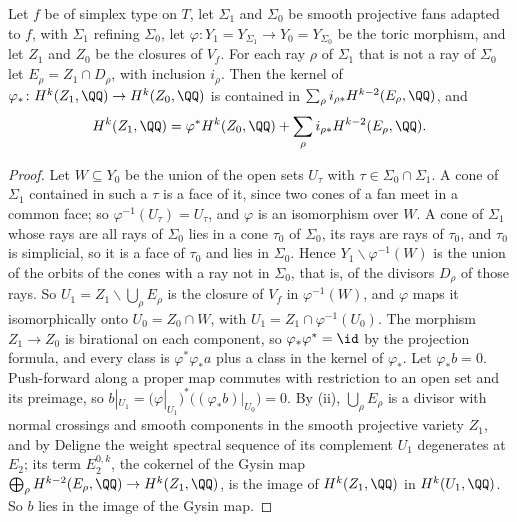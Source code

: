 \begin{lemma}\label{lem:toricmod}
Let $f$ be of simplex type on $T$, let $\Sigma_{1}$ and $\Sigma_{0}$ be
smooth projective fans adapted to $f$, with $\Sigma_{1}$ refining
$\Sigma_{0}$, let $\varphi\colon Y_{1}=Y_{\Sigma_{1}}\to Y_{0}=Y_{\Sigma_{0}}$
be the toric morphism, and let $Z_{1}$ and $Z_{0}$ be the closures of
$V_{f}$. For each ray $\rho$ of $\Sigma_{1}$ that is not a ray of
$\Sigma_{0}$ let $E_{\rho}=Z_{1}\cap D_{\rho}$, with inclusion $i_{\rho}$.
Then the kernel of $\varphi_{*}\colon H^{k}(Z_{1},\QQ)\to H^{k}(Z_{0},\QQ)$ is
contained in $\sum_{\rho}i_{\rho*}H^{k-2}(E_{\rho},\QQ)$, and
\[
  H^{k}(Z_{1},\QQ)=\varphi^{*}H^{k}(Z_{0},\QQ)
  +\sum_{\rho}i_{\rho*}H^{k-2}(E_{\rho},\QQ).
\]
\end{lemma}

\begin{proof}
Let $W\subseteq Y_{0}$ be the union of the open sets $U_{\tau}$ with
$\tau\in\Sigma_{0}\cap\Sigma_{1}$. A cone of $\Sigma_{1}$ contained in such a
$\tau$ is a face of it, since two cones of a fan meet in a common face; so
$\varphi^{-1}(U_{\tau})=U_{\tau}$, and $\varphi$ is an isomorphism over $W$. A
cone of $\Sigma_{1}$ whose rays are all rays of $\Sigma_{0}$ lies in a cone
$\tau_{0}$ of $\Sigma_{0}$, its rays are rays of $\tau_{0}$, and $\tau_{0}$
is simplicial, so it is a face of $\tau_{0}$ and lies in $\Sigma_{0}$. Hence
$Y_{1}\smallsetminus\varphi^{-1}(W)$ is the union of the orbits of the cones
with a ray not in $\Sigma_{0}$, that is, of the divisors $D_{\rho}$ of those
rays. So $U_{1}=Z_{1}\smallsetminus\bigcup_{\rho}E_{\rho}$ is the closure of
$V_{f}$ in $\varphi^{-1}(W)$, and $\varphi$ maps it isomorphically onto
$U_{0}=Z_{0}\cap W$, with $U_{1}=Z_{1}\cap\varphi^{-1}(U_{0})$. The morphism
$Z_{1}\to Z_{0}$ is birational on each component, so $\varphi_{*}\varphi^{*}
=\id$ by the projection formula, and every class is $\varphi^{*}\varphi_{*}a$
plus a class in the kernel of $\varphi_{*}$. Let $\varphi_{*}b=0$.
Push-forward along a proper map commutes with restriction to an open set and
its preimage, so $b|_{U_{1}}=(\varphi|_{U_{1}})^{*}\bigl((\varphi_{*}b)|_{U_{0}}
\bigr)=0$. By (ii), $\bigcup_{\rho}E_{\rho}$ is a
divisor with normal crossings and smooth components in the smooth projective
variety $Z_{1}$, and by Deligne \cite[\S3.2]{Del71} the weight spectral
sequence of its complement $U_{1}$ degenerates at $E_{2}$; its term
$E_{2}^{0,k}$, the cokernel of the Gysin map
$\bigoplus_{\rho}H^{k-2}(E_{\rho},\QQ)\to H^{k}(Z_{1},\QQ)$, is the image of
$H^{k}(Z_{1},\QQ)$ in $H^{k}(U_{1},\QQ)$. So $b$ lies in the image of the
Gysin map.
\end{proof}

